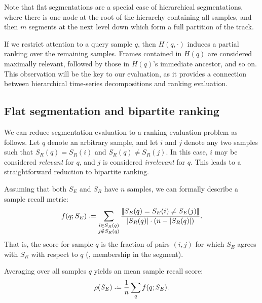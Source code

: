 \documentclass{article}
\begin{document}
Note that flat segmentations are a special case of hierarchical segmentations, where there is one node at the root of the hierarchy
containing all samples, and then $m$ segments at the next level down which form a full partition of the track.

If we restrict attention to a query sample $q$, then $H(q, \cdot)$ induces a partial ranking over the
remaining samples.  Frames contained in $H(q)$ are considered maximally relevant,
followed by those in $H(q)$'s immediate ancestor, and so on.
This observation will be the key to our evaluation, as it provides a connection
between hierarchical time-series decompositions and ranking evaluation.


\subsection{Flat segmentation and bipartite ranking}

We can reduce segmentation evaluation to a ranking evaluation problem as follows.
Let $q$ denote an arbitrary sample, and let $i$ and $j$ denote any two samples such that $S_R(q) = S_R(i)$ and $S_R(q) \neq S_R(j)$.
In this case, $i$ may be considered \emph{relevant} for $q$, and $j$ is considered \emph{irrelevant} for $q$.
This leads to a straightforward reduction to bipartite ranking.

Assuming that both $S_E$ and $S_R$ have $n$ samples, we can formally describe a sample 
recall metric:
\begin{equation}
f(q ; S_E) \defeq 
\sum_{\substack{i \in S_R(q)\\ j \notin S_R(q)}}
\frac{\ind{S_E(q) = S_E(i) \neq S_E(j) }}{|S_R(q)|\cdot (n -
|S_R(q)|)}.\label{flatrecall}
\end{equation}
That is, the score for sample $q$ is the fraction of pairs $(i, j)$ for which $S_E$
agrees with $S_R$ with respect to $q$ (\ie, membership in the segment).

Averaging over all samples $q$ yields an mean sample recall score:
\begin{equation}
\rho(S_E) \defeq \frac{1}{n} \sum_q f(q ; S_E).\label{avgrecall}
\end{equation}
\nocite{levy2008structural}
\end{document}

